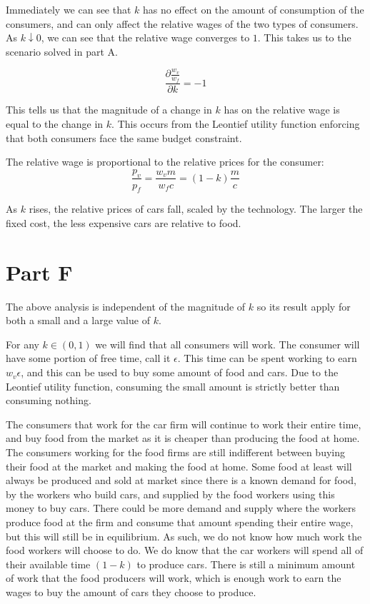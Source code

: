 \documentclass[12pt]{paper}
\begin{document}
Immediately we can see that $k$ has no effect on the amount of
consumption of the consumers, and can only affect the relative
wages of the two types of consumers. As $k \downarrow 0$, we can see that the
relative wage converges to $1$. This takes us to the scenario solved
in part A.

\begin{equation*}
  \frac{\partial \frac{w_v}{w_f}}{\partial k} = -1 
\end{equation*}

This tells us that the magnitude of a change in $k$ has on the
relative wage is equal to the change in $k$. This occurs from the
Leontief utility function enforcing that both consumers face the same
budget constraint.

The relative wage is proportional to the relative prices for the
consumer:
\begin{equation*}
  \frac{p_v}{p_f} = \frac{w_v m }{w_f c} = (1-k) \frac{m}{c}  
\end{equation*}

As $k$ rises, the relative prices of cars fall, scaled by the
technology. The larger the fixed cost, the less expensive cars are
relative to food. 

\section*{Part F}
The above analysis is independent of the magnitude of $k$ so
its result apply for both a small and a large value of $k$.

For any $k \in (0,1)$ we will find that all consumers will work. The
consumer will have some portion of free time, call it $\epsilon$. This time
can be spent working to earn $w_v \epsilon$, and this can be used to buy some
amount of food and cars. Due to the Leontief utility function,
consuming the small amount is strictly better than consuming nothing.

The consumers that work for the car firm will continue to work their
entire time, and buy food from the market as it is cheaper than
producing the food at home. The consumers working for the food firms
are still indifferent between buying their food at the market and
making the food at home. Some food at least will always be produced
and sold at market since there is a known demand for food, by the
workers who build cars, and supplied by the food workers using this
money to buy cars. There could be more demand and supply where the
workers produce food at the firm and consume that amount spending
their entire wage, but this will still be in equilibrium. As such, we
do not know how much work the food workers will choose to do. We do
know that the car workers will spend all of their available time
$(1-k)$ to produce cars. There is still a minimum amount of work that
the food producers will work, which is enough work to earn the wages
to buy the amount of cars they choose to produce.
\end{document}
